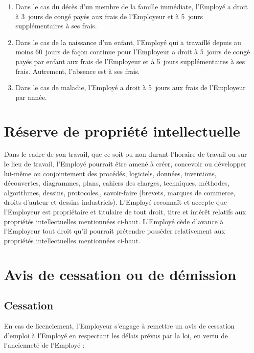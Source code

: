 \documentclass{article}
\begin{document}
    	\begin{enumerate}
    		\item Dans le cas du décès d'un membre de la famille immédiate, l'Employé a droit à 3~jours de congé payés aux frais de l'Employeur et à 5~jours supplémentaires à ses frais.
    	
   			\item Dans le cas de la naissance d'un enfant, l'Employé qui a travaillé depuis au moins 60~jours de façon continue pour l'Employeur a droit à 5~jours de congé payés par enfant aux frais de l'Employeur et à 5~jours supplémentaires à ses frais. Autrement, l'absence est à ses frais.

   			\item Dans le cas de maladie, l'Employé a droit à 5~jours aux frais de l'Employeur par année.

    	\end{enumerate}
    	
    \section{Réserve de propriété intellectuelle}
    Dans le cadre de son travail, que ce soit ou non durant l'horaire de travail ou sur le lieu de travail, l'Employé pourrait être amené à créer, concevoir ou développer lui-même ou conjointement des procédés, logiciels, données, inventions, découvertes, diagrammes, plans, cahiers des charges, techniques, méthodes, algorithmes, dessins, protocoles,, savoir-faire (brevets, marques de commerce, droits d'auteur et dessins industriels).
        L'Employé reconnaît et accepte que l'Employeur est propriétaire et titulaire de tout droit, titre et intérêt relatifs aux propriétés intellectuelles mentionnées ci-haut.
        L'Employé cède d'avance à l'Employeur tout droit qu'il pourrait prétendre posséder relativement aux propriétés intellectuelles mentionnées ci-haut.
    
    \section{Avis de cessation ou de démission}
    	\subsection{Cessation}
	    En cas de licenciement, l'Employeur s'engage à remettre un avis de cessation d'emploi à l'Employé en respectant les délais prévus par la loi, en vertu de l'ancienneté de l'Employé :
	    
\end{document}
